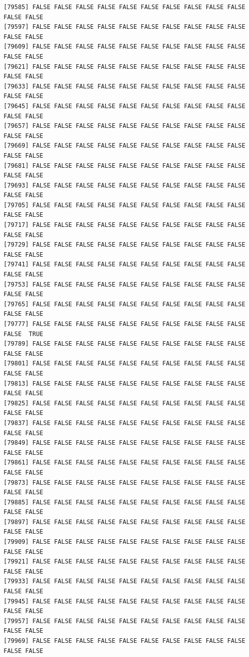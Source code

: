 \documentclass[
  a4paper,
  DIV=11,
  numbers=noendperiod]{scrartcl}
\begin{document}
\begin{verbatim}
[79585] FALSE FALSE FALSE FALSE FALSE FALSE FALSE FALSE FALSE FALSE FALSE FALSE
[79597] FALSE FALSE FALSE FALSE FALSE FALSE FALSE FALSE FALSE FALSE FALSE FALSE
[79609] FALSE FALSE FALSE FALSE FALSE FALSE FALSE FALSE FALSE FALSE FALSE FALSE
[79621] FALSE FALSE FALSE FALSE FALSE FALSE FALSE FALSE FALSE FALSE FALSE FALSE
[79633] FALSE FALSE FALSE FALSE FALSE FALSE FALSE FALSE FALSE FALSE FALSE FALSE
[79645] FALSE FALSE FALSE FALSE FALSE FALSE FALSE FALSE FALSE FALSE FALSE FALSE
[79657] FALSE FALSE FALSE FALSE FALSE FALSE FALSE FALSE FALSE FALSE FALSE FALSE
[79669] FALSE FALSE FALSE FALSE FALSE FALSE FALSE FALSE FALSE FALSE FALSE FALSE
[79681] FALSE FALSE FALSE FALSE FALSE FALSE FALSE FALSE FALSE FALSE FALSE FALSE
[79693] FALSE FALSE FALSE FALSE FALSE FALSE FALSE FALSE FALSE FALSE FALSE FALSE
[79705] FALSE FALSE FALSE FALSE FALSE FALSE FALSE FALSE FALSE FALSE FALSE FALSE
[79717] FALSE FALSE FALSE FALSE FALSE FALSE FALSE FALSE FALSE FALSE FALSE FALSE
[79729] FALSE FALSE FALSE FALSE FALSE FALSE FALSE FALSE FALSE FALSE FALSE FALSE
[79741] FALSE FALSE FALSE FALSE FALSE FALSE FALSE FALSE FALSE FALSE FALSE FALSE
[79753] FALSE FALSE FALSE FALSE FALSE FALSE FALSE FALSE FALSE FALSE FALSE FALSE
[79765] FALSE FALSE FALSE FALSE FALSE FALSE FALSE FALSE FALSE FALSE FALSE FALSE
[79777] FALSE FALSE FALSE FALSE FALSE FALSE FALSE FALSE FALSE FALSE FALSE  TRUE
[79789] FALSE FALSE FALSE FALSE FALSE FALSE FALSE FALSE FALSE FALSE FALSE FALSE
[79801] FALSE FALSE FALSE FALSE FALSE FALSE FALSE FALSE FALSE FALSE FALSE FALSE
[79813] FALSE FALSE FALSE FALSE FALSE FALSE FALSE FALSE FALSE FALSE FALSE FALSE
[79825] FALSE FALSE FALSE FALSE FALSE FALSE FALSE FALSE FALSE FALSE FALSE FALSE
[79837] FALSE FALSE FALSE FALSE FALSE FALSE FALSE FALSE FALSE FALSE FALSE FALSE
[79849] FALSE FALSE FALSE FALSE FALSE FALSE FALSE FALSE FALSE FALSE FALSE FALSE
[79861] FALSE FALSE FALSE FALSE FALSE FALSE FALSE FALSE FALSE FALSE FALSE FALSE
[79873] FALSE FALSE FALSE FALSE FALSE FALSE FALSE FALSE FALSE FALSE FALSE FALSE
[79885] FALSE FALSE FALSE FALSE FALSE FALSE FALSE FALSE FALSE FALSE FALSE FALSE
[79897] FALSE FALSE FALSE FALSE FALSE FALSE FALSE FALSE FALSE FALSE FALSE FALSE
[79909] FALSE FALSE FALSE FALSE FALSE FALSE FALSE FALSE FALSE FALSE FALSE FALSE
[79921] FALSE FALSE FALSE FALSE FALSE FALSE FALSE FALSE FALSE FALSE FALSE FALSE
[79933] FALSE FALSE FALSE FALSE FALSE FALSE FALSE FALSE FALSE FALSE FALSE FALSE
[79945] FALSE FALSE FALSE FALSE FALSE FALSE FALSE FALSE FALSE FALSE FALSE FALSE
[79957] FALSE FALSE FALSE FALSE FALSE FALSE FALSE FALSE FALSE FALSE FALSE FALSE
[79969] FALSE FALSE FALSE FALSE FALSE FALSE FALSE FALSE FALSE FALSE FALSE FALSE

\end{verbatim}
\end{document}
